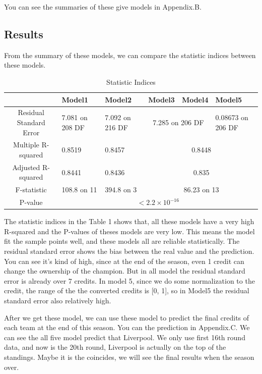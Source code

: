 \documentclass[12pt]{article}
\begin{document}
You can see the summaries of these give models in Appendix.B.
\subsection{Results}
From the summary of these models, we can compare the statistic indices between these models.

\begin{table}[h]
    \scriptsize 
    \centering
    \begin{tabular}{c m{8em}<{\centering} m{8em}<{\centering} m{8em}<{\centering} m{8em}<{\centering} m{9em}<{\centering}}
    \toprule
     & Model1 & Model2 & Model3 & Model4 & Model5\\
    \midrule
    Residual Standard Error & 7.081 on 208 DF & 7.092 on 216 DF& \multicolumn{2}{c}{7.285 on 206 DF} & 0.08673 on 206 DF  \\
    Multiple R-squared & 0.8519 & 0.8457& \multicolumn{3}{c}{0.8448}\\
    Adjusted R-squared & 0.8441 & 0.8436& \multicolumn{3}{c}{0.835}\\
    F-statistic & 108.8 on 11 &394.8 on 3 & \multicolumn{3}{c}{86.23 on 13}\\
    P-value & \multicolumn{5}{c}{$<2.2\times 10^{-16}$}\\
    \bottomrule
    \end{tabular}
    \caption{Statistic Indices}
\end{table}

The statistic indices in the Table 1 shows that, all these models have a very high R-squared and the P-values of theses models are very low. This means the model fit the sample points well, and these models all are reliable statistically. The residual standard error shows the bias between the real value and the prediction. You can see it's kind of high, since at the end of the season, even 1 credit can change the ownership of the champion. But in all model the residual standard error is already over 7 credits. In model 5, since we do some normalization to the credit, the range of the the converted credits is [0, 1], so in Model5 the residual standard error also relatively high. 

After we get these model, we can use these model to predict the final credits of each team at the end of this season. You can the prediction in Appendix.C. We can see the all five model predict that Liverpool. We only use first 16th round data, and now is the 20th round, Liverpool is actually on the top of the standings. Maybe it is the coincides, we will see the final results when the season over.
\end{document}
